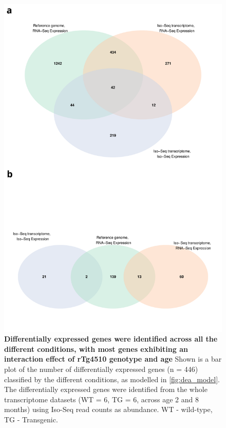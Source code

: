 \begin{figure}[h]
	\centering
	\includegraphics[page=5,trim={0 20cm 0 0},clip,scale = 0.55]{Figures/WholeDifferentialAnalysis.pdf}
	\captionsetup{width=0.95\textwidth}
	\caption[Differentially expressed genes classified by conditions]%
	{\textbf{Differentially expressed genes were identified across all the different conditions, with most genes exhibiting an interaction effect of rTg4510 genotype and age} Shown is a bar plot of the number of differentially expressed genes (n = 446) classified by the different conditions, as modelled in \cref{fig:dea_model}. The differentially expressed genes were identified from the whole transcriptome datasets (WT = 6, TG = 6, across age 2 and 8 months) using Iso-Seq read counts as abundance. WT - wild-type, TG - Transgenic.}    
	\label{fig:dea_model_num}
\end{figure}

